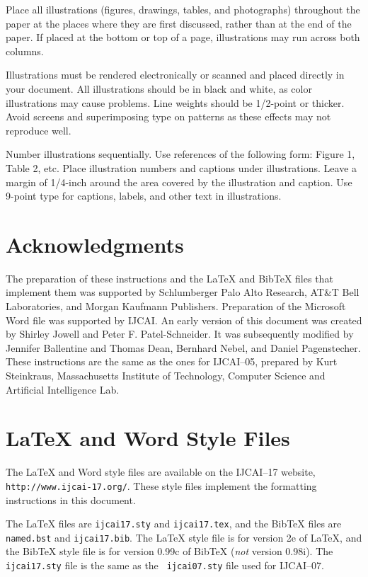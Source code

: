 \documentclass{article}
\theoremstyle{definition}
\begin{document}
Place all illustrations (figures, drawings, tables, and photographs)
throughout the paper at the places where they are first discussed,
rather than at the end of the paper. If placed at the bottom or top of
a page, illustrations may run across both columns.

Illustrations must be rendered electronically or scanned and placed
directly in your document. All illustrations should be in black and
white, as color illustrations may cause problems. Line weights should
be 1/2-point or thicker. Avoid screens and superimposing type on
patterns as these effects may not reproduce well.

Number illustrations sequentially. Use references of the following
form: Figure 1, Table 2, etc. Place illustration numbers and captions
under illustrations. Leave a margin of 1/4-inch around the area
covered by the illustration and caption.  Use 9-point type for
captions, labels, and other text in illustrations.

\section*{Acknowledgments}

The preparation of these instructions and the \LaTeX{} and Bib\TeX{}
files that implement them was supported by Schlumberger Palo Alto
Research, AT\&T Bell Laboratories, and Morgan Kaufmann Publishers.
Preparation of the Microsoft Word file was supported by IJCAI.  An
early version of this document was created by Shirley Jowell and Peter
F. Patel-Schneider.  It was subsequently modified by Jennifer
Ballentine and Thomas Dean, Bernhard Nebel, and Daniel Pagenstecher.
These instructions are the same as the ones for IJCAI--05, prepared by
Kurt Steinkraus, Massachusetts Institute of Technology, Computer
Science and Artificial Intelligence Lab.

\appendix

\section{\LaTeX{} and Word Style Files}\label{stylefiles}

The \LaTeX{} and Word style files are available on the IJCAI--17
website, {\tt http://www.ijcai-17.org/}.
These style files implement the formatting instructions in this
document.

The \LaTeX{} files are {\tt ijcai17.sty} and {\tt ijcai17.tex}, and
the Bib\TeX{} files are {\tt named.bst} and {\tt ijcai17.bib}. The
\LaTeX{} style file is for version 2e of \LaTeX{}, and the Bib\TeX{}
style file is for version 0.99c of Bib\TeX{} ({\em not} version
0.98i). The {\tt ijcai17.sty} file is the same as the {\tt
ijcai07.sty} file used for IJCAI--07.
\end{document}

